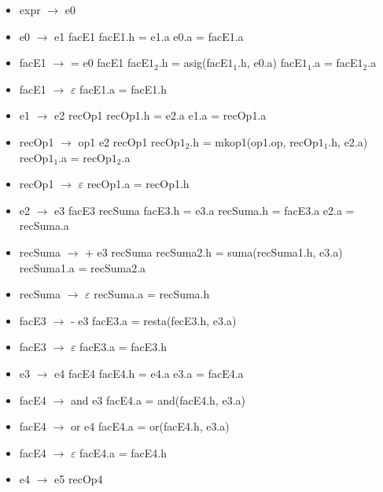 \documentclass[11pt]{article}
\begin{document}
        \begin{itemize}
            \item expr $\rightarrow$ e0
            \item e0 $\rightarrow$ e1 facE1
                \subitem facE1.h = e1.a
                \subitem e0.a = facE1.a
            \item facE1 $\rightarrow$ = e0 facE1
                \subitem facE$1_2$.h = asig(facE$1_1$.h, e0.a)
                \subitem facE$1_1$.a = facE$1_2$.a
            \item facE1 $\rightarrow$ $\varepsilon$
                \subitem facE1.a = facE1.h
            \item e1 $\rightarrow$ e2 recOp1
                \subitem recOp1.h = e2.a
                \subitem e1.a = recOp1.a
            \item recOp1 $\rightarrow$ op1 e2 recOp1
                \subitem recOp$1_2$.h = mkop1(op1.op, recOp$1_1$.h, e2.a)
                \subitem recOp$1_1$.a = recOp$1_2$.a
            \item recOp1 $\rightarrow$ $\varepsilon$
                \subitem recOp1.a = recOp1.h
            \item e2 $\rightarrow$ e3 facE3 recSuma
                \subitem facE3.h = e3.a
                \subitem recSuma.h = facE3.a
                \subitem e2.a = recSuma.a
            \item recSuma $\rightarrow$ + e3 recSuma
                \subitem recSuma2.h = suma(recSuma1.h, e3.a)
                \subitem recSuma1.a = recSuma2.a
            \item recSuma $\rightarrow$ $\varepsilon$
                \subitem recSuma.a = recSuma.h
            \item facE3 $\rightarrow$ - e3
                \subitem facE3.a = resta(fecE3.h, e3.a)
            \item facE3 $\rightarrow$ $\varepsilon$
                \subitem facE3.a = facE3.h
            \item e3 $\rightarrow$ e4 facE4
                \subitem facE4.h = e4.a
                \subitem e3.a = facE4.a
            \item facE4 $\rightarrow$ and e3
                \subitem facE4.a = and(facE4.h, e3.a)
            \item facE4 $\rightarrow$ or e4
                \subitem facE4.a = or(facE4.h, e3.a)
            \item facE4 $\rightarrow$ $\varepsilon$
                \subitem facE4.a = facE4.h
            \item e4 $\rightarrow$ e5 recOp4

\end{itemize}
\end{document}
